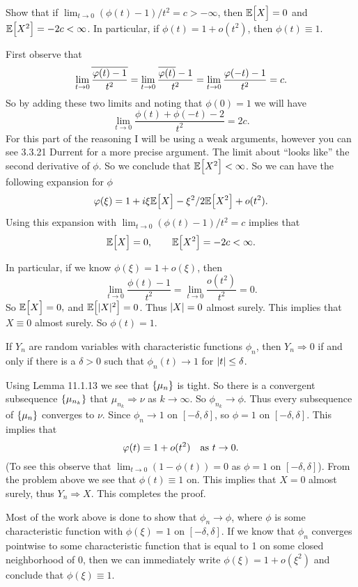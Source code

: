 \begin{problem}
	Show that if $ \lim_{t\to 0 }(\phi(t)-1)/t^2 = c > -\infty $, then $ \E{X} = 0 $ and $ \E{X^2} = -2c < \infty $. In particular, if $ \phi(t) = 1 + o(t^2) $, then $ \phi(t) \equiv 1 $.
\end{problem}
\begin{solution}
	First observe that 
	\[ \lim_{t\to 0}\conj{\frac{\phi(t) - 1}{t^2}} = \lim_{t\to0}\frac{\conj{\phi(t)} - 1}{t^2} = \lim_{t\to 0} \frac{\phi(-t)-1}{t^2} = c. \]
	So by adding these two limits and noting that $ \phi(0) = 1 $ we will have
	\[ \lim_{t\to 0}\frac{\phi(t) + \phi(-t) -2}{t^2} = 2c. \]
	For this part of the reasoning I will be using a weak arguments, however you can see 3.3.21 Durrent for a more precise argument. The limit about ``looks like'' the second derivative of $ \phi $. So we conclude that $ \E{X^2}<\infty $. So we can have the following expansion for $ \phi $
	\[ \phi(\xi) = 1 + i\xi\E{X} - \xi^2/2\E{X^2} + o(t^2).  \]
	Using this expansion with $  \lim_{t\to 0 }(\phi(t)-1)/t^2 = c $ implies that 
	\[ \E{X} = 0, \qquad \E{X^2} = -2c < \infty. \]
	
	In particular, if we know $ \phi(\xi) = 1 + o(\xi) $, then
	\[ \lim_{t\to 0}\frac{\phi(t)-1}{t^2} = \lim_{t\to 0}\frac{o(t^2)}{t^2} = 0. \]
	So $ \E{X} = 0,$ and $\E{\abs{X}^2} = 0 $. Thus $ \abs{X} = 0 $ almost surely. This implies that $ X\equiv 0 $ almost surely. So $ \phi(t) = 1 $.
\end{solution}


\begin{problem}
	If $ Y_n $ are random variables with characteristic functions $ \phi_n $, then $ Y_n \Rightarrow 0 $ if and only if there is a $ \delta >0 $ such that $ \phi_n(t) \to 1 $ for $ \abs{t} \leq \delta $.
\end{problem}
\begin{solution}
	Using Lemma 11.1.13 we see that $ \set{\mu_n} $ is tight. So there is a convergent subsequence $ \set{\mu_{n_k}} $ that $ \mu_{n_k} \Rightarrow \nu $ as $ k \to\infty $. So $ \phi_{n_k} \to \phi $. Thus every subsequence of $ \set{\mu_n} $ converges to $ \nu $. Since $ \phi_n \to 1 $ on $ [-\delta,\delta] $, so $ \phi = 1 $ on $ [-\delta, \delta] $. This implies that 
	\[ \phi(t) = 1 + o (t^2) \quad \text{as $ t\to 0 $}. \]
	(To see this observe that $ \lim_{t\to0} (1-\phi(t)) = 0 $ as $ \phi =1 $ on $ [-\delta,\delta] $). From the problem above we see that $ \phi(t) \equiv 1 $ on. This implies that $ X = 0 $ almost surely, thus $ Y_n \Rightarrow X $. This completes the proof.
\end{solution}
\begin{remark}
	Most of the work above is done to show that $ \phi_n \to \phi $, where $ \phi $ is some characteristic function with $ \phi(\xi) = 1 $ on $ [-\delta, \delta] $. If we know that $ \phi_n $ converges pointwise to some characteristic function that is equal to 1 on some closed neighborhood of 0, then we can immediately write $ \phi(\xi) = 1 + o(\xi^2) $ and conclude that $ \phi(\xi) \equiv 1 $.
\end{remark}

